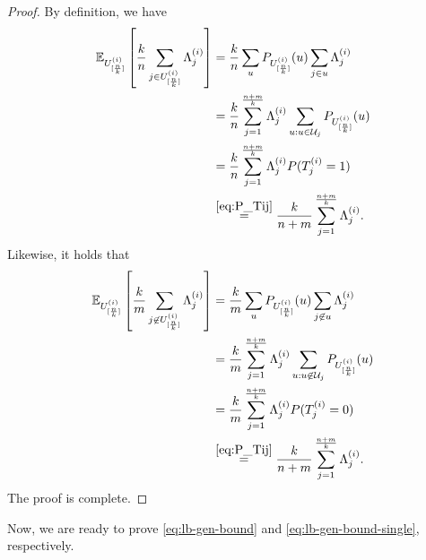 \documentclass[onecolumn,romanappendices,10pt]{IEEEtran}
\newcommand{\Ucal}{{\mathcal U}}
\newcommand{\EE}{{\mathbb{E}}}
\begin{document}
	\begin{proof}
		By definition, we have
		\begin{equation}
			\begin{aligned}
				\EE_{U^{(i)}_{[\frac{n}{k}]}} \left[ \frac{k}{n} \sum_{j \in U^{(i)}_{[\frac{n}{k}]}} \Lambda^{(i)}_j \right] &= \frac{k}{n} \sum_{u} P_{U^{(i)}_{[\frac{n}{k}]}}(u) \sum_{j \in u} \Lambda^{(i)}_j \\
				&= \frac{k}{n} \sum_{j=1}^{\frac{n+m}{k}} \Lambda^{(i)}_j \sum_{u : u \in \Ucal_j} P_{U^{(i)}_{[\frac{n}{k}]}}(u) \\
				&= \frac{k}{n}  \sum_{j=1}^{\frac{n+m}{k}} \Lambda^{(i)}_j P(T^{(i)}_j = 1) \\
				&\overset{\eqref{eq:P_Tij}}{=} \frac{k}{n+m} \sum_{j=1}^{\frac{n+m}{k}} \Lambda^{(i)}_j.
			\end{aligned}
		\end{equation}
		Likewise, it holds that
		\begin{equation}
			\begin{aligned}
				\EE_{U^{(i)}_{[\frac{n}{k}]}} \left[ \frac{k}{m} \sum_{j \not\in U^{(i)}_{[\frac{n}{k}]}} \Lambda^{(i)}_j \right] &= \frac{k}{m} \sum_{u} P_{U^{(i)}_{[\frac{n}{k}]}}(u) \sum_{j \not\in u} \Lambda^{(i)}_j \\
				&= \frac{k}{m} \sum_{j=1}^{\frac{n+m}{k}} \Lambda^{(i)}_j \sum_{u : u \not\in \Ucal_j} P_{U^{(i)}_{[\frac{n}{k}]}}(u) \\
				&= \frac{k}{m}  \sum_{j=1}^{\frac{n+m}{k}} \Lambda^{(i)}_j P(T^{(i)}_j = 0) \\
				&\overset{\eqref{eq:P_Tij}}{=} \frac{k}{n+m} \sum_{j=1}^{\frac{n+m}{k}} \Lambda^{(i)}_j.
			\end{aligned}
		\end{equation}
		The proof is complete.
	\end{proof}
	
	Now, we are ready to prove \eqref{eq:lb-gen-bound} and \eqref{eq:lb-gen-bound-single}, respectively.
\end{document}
